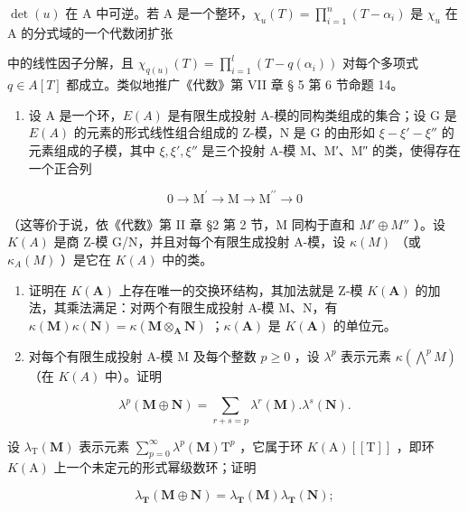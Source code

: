 \(\det(u)\) 在 A 中可逆。若 A 是一个整环，\(\chi_u(T) = \prod_{i=1}^{n} (T - \alpha_i)\) 是 \(\chi_u\) 在 A 的分式域的一个代数闭扩张

中的线性因子分解，且 \(\chi_{q(u)}(T) = \prod_{i=1}^{l} (T - q(\alpha_i))\) 对每个多项式 \(q \in A[T]\) 都成立。类似地推广《代数》第 VII 章 § 5 第 6 节命题 14。

\begin{enumerate}
\def\labelenumi{\arabic{enumi}.}
\setcounter{enumi}{9}
\tightlist
\item
  设 A 是一个环，\(E(A)\) 是有限生成投射 A-模的同构类组成的集合；设 G 是 \(E(A)\) 的元素的形式线性组合组成的 Z-模，N 是 G 的由形如 \(\xi - \xi' - \xi''\) 的元素组成的子模，其中 \(\xi, \xi', \xi''\) 是三个投射 A-模 M、M′、M″ 的类，使得存在一个正合列
\end{enumerate}

\[
0 \rightarrow \mathrm{M} ^ {\prime} \rightarrow \mathrm{M} \rightarrow \mathrm{M} ^ {\prime \prime} \rightarrow 0
\]

（这等价于说，依《代数》第 II 章 §2 第 2 节，M 同构于直和 \(M' \oplus M''\) ）。设 \(K(A)\) 是商 Z-模 G/N，并且对每个有限生成投射 A-模，设 \(\kappa(M)\) （或 \(\kappa_{A}(M)\) ）是它在 \(K(A)\) 中的类。

\begin{enumerate}
\def\labelenumi{(\alph{enumi})}
\item
  证明在 \(K(\mathbf{A})\) 上存在唯一的交换环结构，其加法就是 Z-模 \(K(\mathbf{A})\) 的加法，其乘法满足：对两个有限生成投射 A-模 M、N，有 \(\kappa(\mathbf{M})\kappa(\mathbf{N}) = \kappa(\mathbf{M} \otimes_{\mathbf{A}} \mathbf{N})\) ；\(\kappa(\mathbf{A})\) 是 \(K(\mathbf{A})\) 的单位元。
\item
  对每个有限生成投射 A-模 M 及每个整数 \(p \geqslant 0\) ，设 \(\lambda^p\) 表示元素 \(\kappa(\bigwedge^p M)\) （在 \(K(A)\) 中）。证明
\end{enumerate}

\[
\lambda^ {p} (\mathbf {M} \oplus \mathbf {N}) = \sum_ {r + s = p} \lambda^ {r} (\mathbf {M}). \lambda^ {s} (\mathbf {N}).
\]

设 \(\lambda_{\mathrm{T}}(\mathbf{M})\) 表示元素 \(\sum_{p=0}^{\infty} \lambda^{p}(\mathbf{M}) \mathrm{T}^{p}\) ，它属于环 \(K(\mathrm{A})[[\mathrm{T}]]\) ，即环 \(K(\mathrm{A})\) 上一个未定元的形式幂级数环；证明

\[
\lambda_ {\mathbf {T}} (\mathbf {M} \oplus \mathbf {N}) = \lambda_ {\mathbf {T}} (\mathbf {M}) \lambda_ {\mathbf {T}} (\mathbf {N});
\]

